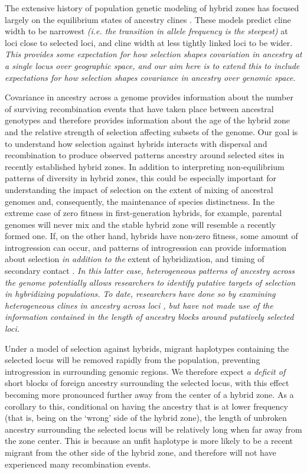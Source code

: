 \documentclass[11pt,letterpaper]{article}
\newcommand{\yb}[1]{{\em \color{magenta} #1}}
\begin{document}
The extensive history of population genetic modeling of hybrid zones has focused largely on the equilibrium states of ancestry clines \citep{Barton1979a,Barton1986}.  
These models predict cline width to be narrowest \yb{(i.e. the transition in allele frequency is the steepest)} at loci close to selected loci, and cline width at less tightly linked loci to be wider. %
\yb{This provides some expectation for how selection shapes covariation in ancestry at a single locus over \emph{geographic space}, and our aim here  is to extend this to include expectations for how selection shapes covariance in ancestry over \emph{genomic space}}.

Covariance in ancestry across a genome provides information about the number of surviving recombination events that have taken place between ancestral genotypes and therefore provides information about the age of the hybrid zone and the relative strength of selection affecting subsets of the genome. Our goal is to understand how selection against hybrids interacts with dispersal and recombination to produce observed patterns ancestry around selected sites in recently established hybrid zones. In addition to interpreting non-equilibrium patterns of diversity in hybrid zones, this could be especially important for understanding the impact of selection on the extent of mixing of ancestral genomes and, consequently, the maintenance of species distinctness. In the extreme case of zero fitness in first-generation hybrids, for example, parental genomes will never mix and the stable hybrid zone will resemble a recently formed one. 
If, on the other hand, hybrids have non-zero fitness, some amount of introgression can occur, and  patterns of introgression can provide information about selection \yb{in addition to the} extent of hybridization, and timing of secondary contact \citep{Price2009, Hellenthal2014}. 
\yb{In this latter case, heterogeneous patterns of ancestry across the genome potentially allows researchers to identify putative targets of selection in hybridizing populations.}  
\yb{To date, researchers have done so by examining heterogeneous clines in ancestry across loci \citep{Porter1997, Gompert2012}, but have not made use of the information contained in the length of ancestry blocks around putatively selected loci.}  

Under a model of selection against hybrids, migrant haplotypes containing the selected locus will be removed rapidly from the population, preventing introgression in surrounding genomic regions. We therefore expect \yb{a deficit of} short blocks of foreign ancestry surrounding the selected locus, with this effect becoming more pronounced further away from the center of a hybrid zone. As a corollary to this, conditional on having the ancestry that is at lower frequency (that is, being on the `wrong' side of the hybrid zone), the length of unbroken ancestry surrounding the selected locus will be relatively long when far away from the zone center.  This is because an unfit haplotype is more likely to be a recent migrant from the other side of the hybrid zone, and therefore will not have experienced many recombination events. 
\end{document}
